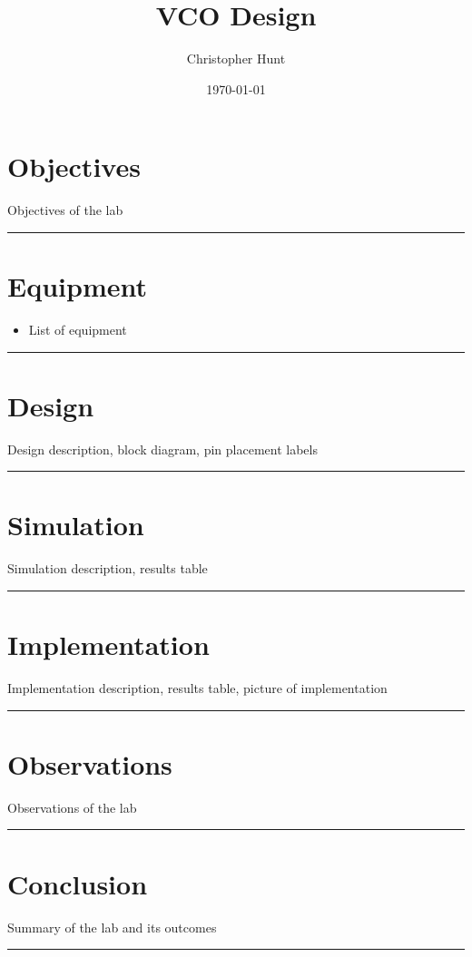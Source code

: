 \documentclass{article}
\title{\textbf{{\huge VCO Design}}}
\author{Christopher Hunt}
\date{\today}
\begin{document}
\pagestyle{fancy}
\fancyhf{}
\rhead{\thepage}
\maketitle
\section*{\textcolor{mycolor}{Objectives}}
Objectives of the lab
\vspace{5mm}
\hrule

\section*{\textcolor{mycolor}{Equipment}}
\begin{itemize}
  \item List of equipment
\end{itemize}
\vspace{5mm}
\hrule

\section*{\textcolor{mycolor}{Design}}
Design description, block diagram, pin placement labels
\vspace{5mm}
\hrule

\section*{\textcolor{mycolor}{Simulation}}
Simulation description, results table
\vspace{5mm}
\hrule

\section*{\textcolor{mycolor}{Implementation}}
Implementation description, results table, picture of implementation
\vspace{5mm}
\hrule

\section*{\textcolor{mycolor}{Observations}}
Observations of the lab
\vspace{5mm}
\hrule

\section*{\textcolor{mycolor}{Conclusion}}
Summary of the lab and its outcomes
\vspace{5mm}
\hrule
\end{document}
